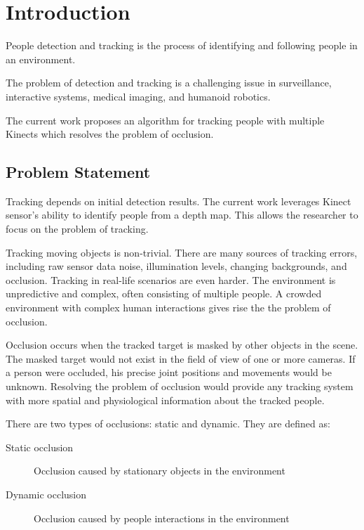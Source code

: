 


\chapter{Introduction}

\label{chapter:introduction}

People detection and tracking is the process of identifying and following people in an environment. 

The problem of detection and tracking is a challenging issue in surveillance, interactive systems, medical imaging, and humanoid robotics.

The current work proposes an algorithm for tracking people with multiple Kinects which resolves the problem of occlusion.

\section{Problem Statement}
\label{sec:introduction_problem_statement}

Tracking depends on initial detection results. The current work leverages Kinect sensor's ability to identify people from a depth map. This allows the researcher to focus on the problem of tracking.

Tracking moving objects is non-trivial. There are many sources of tracking errors, including raw sensor data noise, illumination levels, changing backgrounds, and occlusion. Tracking in real-life scenarios are even harder. The environment is unpredictive and complex, often consisting of multiple people. A crowded environment with complex human interactions gives rise the the problem of occlusion.

Occlusion occurs when the tracked target is masked by other objects in the scene. The masked target would not exist in the field of view of one or more cameras. If a person were occluded, his precise joint positions and movements would be unknown. Resolving the problem of occlusion would provide any tracking system with more spatial and physiological information about the tracked people.

There are two types of occlusions: static and dynamic. They are defined as:

\begin{description}
  \item[Static occlusion] Occlusion caused by stationary objects in the environment 
  \item[Dynamic occlusion] Occlusion caused by people interactions in the environment
\end{description}

